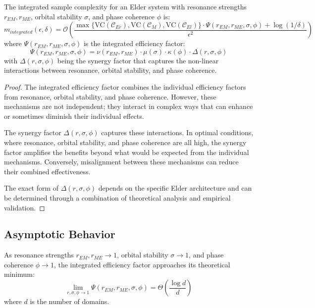 \begin{theorem}
The integrated sample complexity for an Elder system with resonance strengths $r_{EM}, r_{ME}$, orbital stability $\sigma$, and phase coherence $\phi$ is:
\begin{equation}
m_{integrated}(\epsilon, \delta) = \mathcal{O}\left(\frac{\max\{\text{VC}(\mathcal{C}_{Er}), \text{VC}(\mathcal{C}_{M}), \text{VC}(\mathcal{C}_{El})\} \cdot \Psi(r_{EM}, r_{ME}, \sigma, \phi) + \log(1/\delta)}{\epsilon^2}\right)
\end{equation}
where $\Psi(r_{EM}, r_{ME}, \sigma, \phi)$ is the integrated efficiency factor:
\begin{equation}
\Psi(r_{EM}, r_{ME}, \sigma, \phi) = \nu(r_{EM}, r_{ME}) \cdot \mu(\sigma) \cdot \kappa(\phi) \cdot \Delta(r, \sigma, \phi)
\end{equation}
with $\Delta(r, \sigma, \phi)$ being the synergy factor that captures the non-linear interactions between resonance, orbital stability, and phase coherence.
\end{theorem}

\begin{proof}
The integrated efficiency factor combines the individual efficiency factors from resonance, orbital stability, and phase coherence. However, these mechanisms are not independent; they interact in complex ways that can enhance or sometimes diminish their individual effects.

The synergy factor $\Delta(r, \sigma, \phi)$ captures these interactions. In optimal conditions, where resonance, orbital stability, and phase coherence are all high, the synergy factor amplifies the benefits beyond what would be expected from the individual mechanisms. Conversely, misalignment between these mechanisms can reduce their combined effectiveness.

The exact form of $\Delta(r, \sigma, \phi)$ depends on the specific Elder architecture and can be determined through a combination of theoretical analysis and empirical validation.
\end{proof}

\subsection{Asymptotic Behavior}

\begin{corollary}
As resonance strengths $r_{EM}, r_{ME} \to 1$, orbital stability $\sigma \to 1$, and phase coherence $\phi \to 1$, the integrated efficiency factor approaches its theoretical minimum:
\begin{equation}
\lim_{r, \sigma, \phi \to 1} \Psi(r_{EM}, r_{ME}, \sigma, \phi) = \Theta\left(\frac{\log d}{d}\right)
\end{equation}
where $d$ is the number of domains.
\end{corollary}

